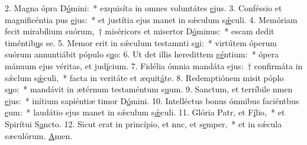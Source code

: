 2. Magna ópra D\uline{ó}mini:~* exquisíta in omnes voluntátes \uline{e}jus.
3. Conféssio et magnificéntia pus \uline{e}jus:~* et justítia ejus manet in sǽculum s\uline{ǽ}culi.
4. Memóriam fecit mirabílium suórum,~† miséricors et misertor D\uline{ó}minus:~* escam dedit timéntib\uline{u}s se.
5. Memor erit in sǽculum testamnti s\uline{u}i:~* virtútem óperum suórum annuntiábit pópulo s\uline{u}o:
6. Ut det illis heredittem g\uline{é}ntium:~* ópera mánuum ejus véritas, et jud\uline{í}cium.
7. Fidélia ómnia mandáta ejus:~† confirmáta in sǽclum s\uline{ǽ}culi,~* facta in veritáte et æquit\uline{á}te.
8. Redemptiónem misit póplo s\uline{u}o:~* mandávit in ætérnum testaméntum s\uline{u}um.
9. Sanctum, et terríbile nmen \uline{e}jus:~* inítium sapiéntiæ timor D\uline{ó}mini.
10. Intelléctus bonus ómnibus faciéntbus \uline{e}um:~* laudátio ejus manet in sǽculum s\uline{ǽ}culi.
11. Glória Patr, et F\uline{í}lio,~* et Spirítui S\uline{a}ncto.
12. Sicut erat in princípio, et nnc, et s\uline{e}mper,~* et in sǽcula sæculórum. \uline{A}men.
